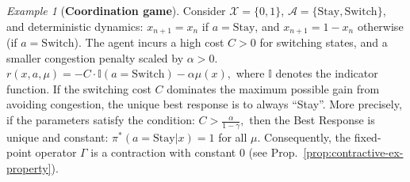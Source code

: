 \documentclass[10pt,twocolumn,letterpaper]{article}
\theoremstyle{definition}
\theoremstyle{remark}
\newtheorem{example}{Example}
\newcommand{\states}{\mathcal{X}}
\newcommand{\actions}{\mathcal{A}}
\begin{document}
\begin{example}[\textbf{Coordination game}]
\label{ex:contractive-example}
    Consider $\states = \{0, 1\}$, $\actions = \{\text{Stay}, \text{Switch}\}$, and deterministic dynamics:
    $x_{n+1} = x_n$ if $a = \text{Stay} $, and $x_{n+1} = 1-x_n$ otherwise (if $a = \text{Switch}$). 
    The agent incurs a high cost $C > 0$ for switching states, and a smaller congestion penalty scaled by $\alpha > 0$.
    \(
        r(x, a, \mu) = -C \cdot \mathbb{I}(a=\text{Switch}) - \alpha \mu(x),
    \)
    where $\mathbb{I}$ denotes the indicator function. 
If the switching cost $C$ dominates the maximum possible gain from avoiding congestion, the unique best response is to always ``Stay''. More precisely,
    if the parameters satisfy the condition:
    \(
        C > \frac{\alpha}{1-\gamma},
    \)
    then the Best Response is unique and constant: $\pi^*(a=\text{Stay}|x) = 1$ for all $\mu$. Consequently, the fixed-point operator $\Gamma$ is a contraction with constant 0 (see Prop.~\ref{prop:contractive-ex-property}).
\end{example}
\end{document}

